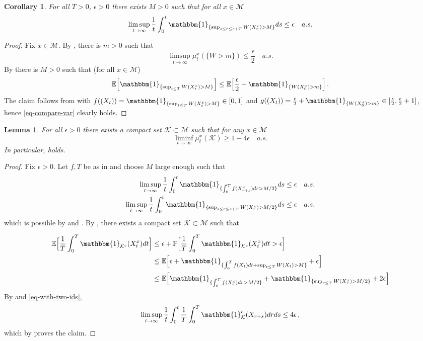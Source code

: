\documentclass[final]{amsart}
\newtheorem{lem}[thm]{Lemma}
\newtheorem{cor}[thm]{Corollary}
\numberwithin{thm}{section}
\numberwithin{equation}{section}
\newcommand{\E}{\mathbb{E}}
\newcommand{\Prb}{\mathbb{P}}
\newcommand{\mcM}{\mathcal{M}}
\newcommand{\Id}{\mathbbm{1}}
\newcommand{\K}{\mathcal{K}}
\begin{document}
\begin{cor}\label{W-small-m-2}
    For all $T > 0$, $\epsilon > 0$ there exists $M > 0$ such that for all $x \in \mcM$
    $$\limsup_{t \to \infty} \frac{1}{t}\int_0^t \Id_{\{\sup_{s \leq r \leq s+T} W(X_r^x) > M\}}ds \leq \epsilon \quad a.s.$$
\end{cor}

\begin{proof}
Fix $x \in \mcM$. 
    By , there is $m > 0$ such that
    $$\limsup_{t \to \infty} \mu_t^x(\{W > m\}) \leq \frac{\epsilon}{2} \quad a.s.$$
    By  there is $M > 0$ such that (for all $x \in \mcM$)
    $$\E\Big[\Id_{\{\sup_{t \leq T} W(X_t^x) > M\}}\Big] \leq \E\Big[\frac{\epsilon}{2} + \Id_{\{W(X_0^x) > m\}}\Big] \,.$$
    The claim follows from  
    with $f((X_t)) = \Id_{\{\sup_{t \leq T} W(X_t^x) > M\}} \in [0, 1]$ and $g((X_t)) = \frac{\epsilon}{2} + \Id_{\{W(X_0^x) > m\}} 
    \in [\frac{\epsilon}{2}, \frac{\epsilon}{2} + 1]$, hence 
      \eqref{eq-compare-var} clearly holds. 
\end{proof}

\begin{lem} \label{occ-is-pretty-tight}
    For all $\epsilon > 0$ there exists a compact set $\K \subset \mcM$ such that for any $x \in \mcM$ $$\liminf_{t \to \infty} \mu_t^x(\K) \geq 1 - 4\epsilon \quad a.s.$$ In particular,  holds.
\end{lem}

\begin{proof}
Fix $\epsilon > 0$. 
Let $f,T$ be as in  and choose $M$ large enough such that
\begin{equation}\label{eq-with-two-ids}
     \begin{aligned}
     \limsup_{t \to \infty} \frac{1}{t}\int_0^t \Id_{\{\int_0^T f(X_{r+s}^x)dr > M/2\}}ds &\leq \epsilon \quad a.s. \\
     \limsup_{t \to \infty} \frac{1}{t}\int_0^t \Id_{\{\sup_{s \leq r \leq s+T} W(X_r^x) > M/2\}}ds &\leq \epsilon \quad a.s.
 \end{aligned}
\end{equation}
which is possible by  and . By , there exists a compact set $\K \subset \mcM$ such that
  
  
  \begin{align*}
      \E\Big[\frac{1}{T}\int_0^T \Id_{\K^c}(X_t^x)dt\Big] 
      &\leq \epsilon + \Prb \Big[\frac{1}{T}\int_0^T \Id_{\K^c}(X_t^x)dt > \epsilon \Big] \\
      &\leq \E\Big[\epsilon + \Id_{\{\int_0^Tf(X_t)dt + \sup_{t \leq T}W(X_t) > M\}} + \epsilon\Big] \\
      &\leq \E\Big[\Id_{\{\int_0^T f(X_{r}^x)dr > M/2\}} + \Id_{\{\sup_{r \leq T} W(X_r^x) > M/2\}} + 2\epsilon\Big]
  \end{align*}
  By  and \eqref{eq-with-two-ids},
  $$\limsup_{t \to \infty} \frac{1}{t}\int_0^t \frac{1}{T} \int_0^T \Id_\K^c(X_{r+s})drds \leq 4\epsilon \,,$$
  which by  proves the claim.




\end{proof}
\end{document}
